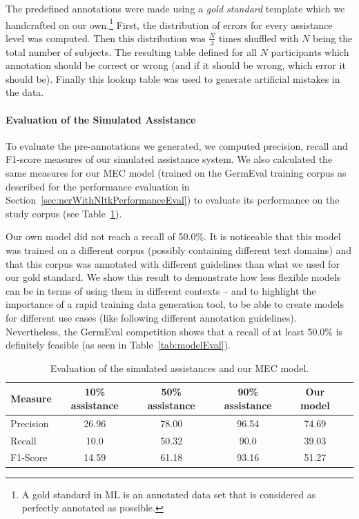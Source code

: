 		The predefined annotations were made using a \textit{gold standard} template which we handcrafted on our own.\footnote{A gold standard in \ac{ML} is an annotated data set that is considered as perfectly annotated as possible.}
		First, the distribution of errors for every assistance level was computed. Then this distribution was $\frac{N}{3}$ times shuffled with $N$ being the total number of subjects. The resulting table defined for all $N$ participants which annotation should be correct or wrong (and if it should be wrong, which error it should be). Finally this lookup table was used to generate artificial mistakes in the data.

		\paragraph{Evaluation of the Simulated Assistance}
		To evaluate the pre-annotations we generated, we computed precision, recall and F1-score measures of our simulated assistance system. We also calculated the same measures for our \ac{MEC} model (trained on the GermEval training corpus as described for the performance evaluation in Section~\ref{sec:nerWithNltkPerformanceEval}) to evaluate its performance on the study corpus (see Table~\ref{tab:preannotationEval}).

		Our own model did not reach a recall of 50.0\%. It is noticeable that this model was trained on a different corpus (possibly containing different text domains) and that this corpus was annotated with different guidelines than what we used for our gold standard. We show this result to demonstrate how less flexible models can be in terms of using them in different contexts -- and to highlight the importance of a rapid training data generation tool, to be able to create models for different use cases (like following different annotation guidelines). Nevertheless, the GermEval competition shows that a recall of at least 50.0\% is definitely feasible (as seen in Table~\ref{tab:modelEval}).

		\begin{table}[h]\centering
			\caption{Evaluation of the simulated assistances and our \acl{MEC} model.}
			\begin{tabular}{lccccc}
				\toprule
				Measure & 10\% assistance & 50\% assistance & 90\% assistance & Our model \\
				\midrule
				Precision & 26.96 & 78.00 & 96.54 & 74.69 \\
				Recall & 10.0 & 50.32 & 90.0 & 39.03 \\
				F1-Score & 14.59 & 61.18 & 93.16 & 51.27 \\
				\bottomrule
			\end{tabular}
			\label{tab:preannotationEval}
		\end{table}
